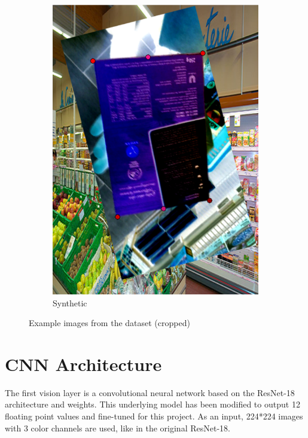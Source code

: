 \documentclass[a4paper,11pt]{report}
\begin{document}
\begin{figure}[h]
\begin{subfigure}{0.45\textwidth}
                        \includegraphics[width=\textwidth]{synthetic_image_example_1.png}
                        \caption{Synthetic}
                        \label{fig:synthetic_image_example_1}
                    \end{subfigure}
                    \caption{Example images from the dataset (cropped)}
                    \label{fig:subsection-examples}
                \end{figure}
                 
    
        \section{CNN Architecture}
            The first vision layer is a convolutional neural network based on the ResNet-18 \cite{he2015deepresiduallearningimage} architecture and weights. This underlying model has been modified to output 12 floating point values and fine-tuned for this project. As an input, 224*224 images with 3 color channels are used, like in the original ResNet-18. 
            
\end{document}

